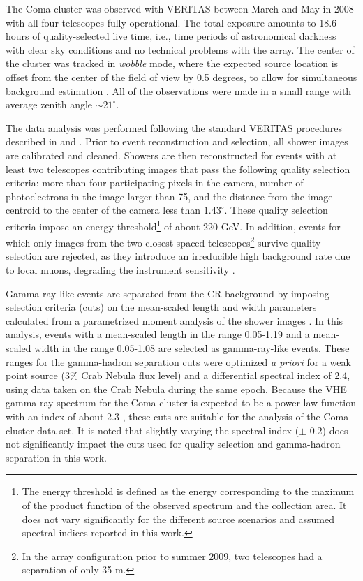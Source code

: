 \documentclass[12pt,manuscript]{aastex}
\begin{document}
The Coma cluster was observed with VERITAS between March and May in 2008 with all four telescopes
fully operational. The total exposure amounts to 18.6 hours of quality-selected live time, i.e.,
time periods of astronomical darkness with clear sky conditions and no technical problems with the
array. The center of the cluster was tracked in \emph{wobble} mode, where the expected source
location is offset from the center of the field of view by 0.5 degrees, to allow for simultaneous
background estimation \citep{article:Fomin_etal:1994}. All of the observations were made in a small
range with average zenith angle $\sim 21^{\circ}$.

The data analysis was performed following the standard VERITAS procedures described in
\citet{inproc:Cogan_etal:2007} and \citet{inproc:Daniel_etal:2007}. Prior to event reconstruction
and selection, all shower images are calibrated and cleaned. Showers are then reconstructed for
events with at least two telescopes contributing images that pass the following quality selection
criteria: more than four participating pixels in the camera, number of photoelectrons in the image
larger than 75, and the distance from the image centroid to the center of the camera less
than $1.43^{\circ}$. These quality selection criteria impose an energy threshold\footnote{The energy
threshold is defined as the energy corresponding to the maximum of the product function of the
observed spectrum and the collection area. It does not vary significantly for the different source
scenarios and assumed spectral indices reported in this work.} of about 220 GeV. In addition,
events for which only images from the two closest-spaced telescopes\footnote{In the array
configuration prior to summer 2009, two telescopes  had a separation of only 35 m.} survive quality
selection are rejected, as they introduce an irreducible high background rate due to local muons, 
degrading the instrument sensitivity \citep{article:MaierKnapp:2007}.

Gamma-ray-like events are separated from the CR background by imposing selection criteria (cuts) on
the mean-scaled length and width parameters \citep{article:Aharonian_etal:1997,
article:Krawczynski_etal:2006} calculated from a parametrized moment analysis of the shower images
\citep{inproc:Hillas:1985}. In this analysis, events with a mean-scaled length in the range 
0.05-1.19 and a mean-scaled width in the range 0.05-1.08 are selected as gamma-ray-like events.
These ranges for the gamma-hadron separation cuts were optimized {\em a priori} for a weak point
source (3\% Crab Nebula flux level) and a differential spectral index of 2.4, using data taken on
the Crab Nebula during the same epoch. Because the VHE gamma-ray spectrum for the Coma cluster is
expected to be a power-law function with an index of about 2.3 \citep{article:PinzkePfrommer:2010},
these cuts are suitable for the analysis of the Coma cluster data set. It is noted that slightly
varying the spectral index ($\pm$ 0.2) does not significantly impact the cuts used for quality
selection and gamma-hadron separation in this work. 
\end{document}
